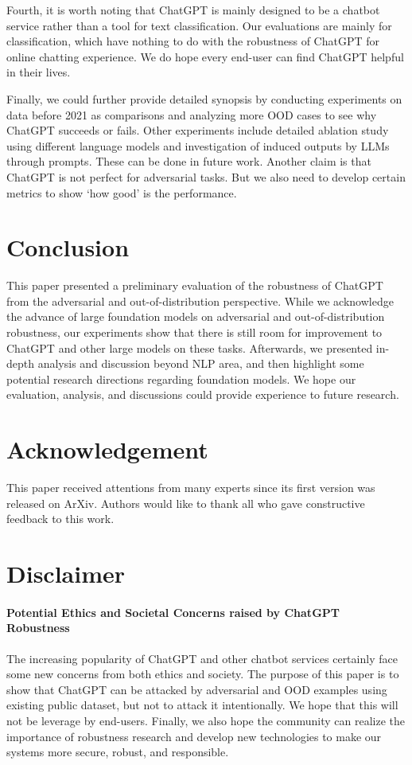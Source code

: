 \documentclass[11pt]{article}
\newcommand{\chat}{ChatGPT\xspace}
\begin{document}
Fourth, it is worth noting that \chat is mainly designed to be a chatbot service rather than a tool for text classification.
Our evaluations are mainly for classification, which have nothing to do with the robustness of \chat for online chatting experience.
We do hope every end-user can find \chat helpful in their lives.

Finally, we could further provide detailed synopsis by conducting experiments on data before 2021 as comparisons and analyzing more OOD cases to see why \chat succeeds or fails.
Other experiments include detailed ablation study using different language models and investigation of induced outputs by LLMs through prompts.
These can be done in future work.
Another claim is that \chat is not perfect for adversarial tasks.
But we also need to develop certain metrics to show `how good' is the performance.


\section{Conclusion}

This paper presented a preliminary evaluation of the robustness of \chat from the adversarial and out-of-distribution perspective.
While we acknowledge the advance of large foundation models on adversarial and out-of-distribution robustness, our experiments show that there is still room for improvement to \chat and other large models on these tasks.
Afterwards, we presented in-depth analysis and discussion beyond NLP area, and then highlight some potential research directions regarding foundation models.
We hope our evaluation, analysis, and discussions could provide experience to future research.

\section*{Acknowledgement}

This paper received attentions from many experts since its first version was released on ArXiv.
Authors would like to thank all who gave constructive feedback to this work.


\section*{Disclaimer}

\paragraph{Potential Ethics and Societal Concerns raised by \chat Robustness}
The increasing popularity of \chat and other chatbot services certainly face some new concerns from both ethics and society.
The purpose of this paper is to show that \chat can be attacked by adversarial and OOD examples using existing public dataset, but not to attack it intentionally.
We hope that this will not be leverage by end-users.
Finally, we also hope the community can realize the importance of robustness research and develop new technologies to make our systems more secure, robust, and responsible.
\end{document}
